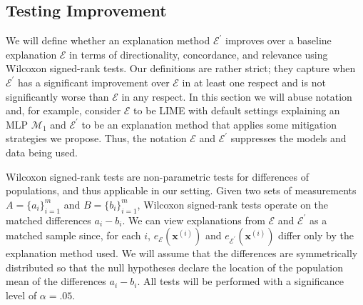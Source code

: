 \documentclass[mnsc,blindrev]{informs3}
\newcommand{\mE}{\mathcal{E}}
\begin{document}
    
    \subsection{Testing Improvement}
        \label{sec:improvement}
        We will define whether an explanation method $\mE^\prime$ improves over a baseline explanation $\mE$ in terms of directionality, concordance, and relevance using Wilcoxon signed-rank tests. Our definitions are rather strict; they capture when $\mE^\prime$ has a significant improvement over $\mE$ in at least one respect and is not significantly worse than $\mE$ in any respect. In this section we will abuse notation and, for example, consider $\mE$ to be LIME with default settings explaining an MLP $\mathcal{M}_1$ and $\mE^\prime$ to be an explanation method that applies some mitigation strategies we propose. Thus, the notation $\mE$ and $\mE^\prime$ suppresses the models and data being used.
        
        
        Wilcoxon signed-rank tests are non-parametric tests for differences of populations, and thus applicable in our setting. Given two sets of measurements $A=\{a_i\}_{i=1}^m$ and $B=\{b_i\}_{i=1}^m$, Wilcoxon signed-rank tests operate on the matched differences $a_i-b_i$. We can view explanations from $\mE$ and $\mE^\prime$ as a matched sample since, for each $i$, $e_{\mE}(\mathbf{x}^{(i)})$ and $e_{\mE^\prime}(\mathbf{x}^{(i)})$ differ only by the explanation method used. We will assume that the differences are symmetrically distributed so that the null hypotheses declare the location of the population mean of the differences $a_i - b_i$. All tests will be performed with a significance level of $\alpha=.05$.
\end{document}
